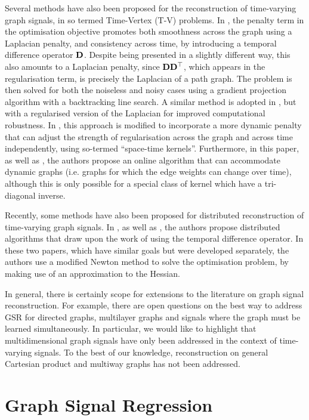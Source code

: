 Several methods have also been proposed for the reconstruction of time-varying graph signals, in so termed Time-Vertex (T-V) problems. In \cite{Qiu2017}, the penalty term in the optimisation objective promotes both smoothness across the graph using a Laplacian penalty, and consistency across time, by introducing a temporal difference operator $\mathbf{D}$. Despite being presented in a slightly different way, this also amounts to a Laplacian penalty, since $\mathbf{D}\mathbf{D}^\top$, which appears in the regularisation term, is precisely the Laplacian of a path graph. The problem is then solved for both the noiseless and noisy cases using a gradient projection algorithm with a backtracking line search. A similar method is adopted in \cite{Giraldo2022}, but with a regularised version of the Laplacian for improved computational robustness. In \cite{Ioannidis2016}, this approach is modified to incorporate a more dynamic penalty that can adjust the strength of regularisation across the graph and across time independently, using so-termed ``space-time kernels''. Furthermore, in this paper, as well as \cite{Romero2017, Ioannidis2018}, the authors propose an online algorithm that can accommodate dynamic graphs (i.e. graphs for which the edge weights can change over time), although this is only possible for a special class of kernel which have a tri-diagonal inverse. 

Recently, some methods have also been proposed for distributed reconstruction of time-varying graph signals. In \cite{Chi2022}, as well as \citep{Zhou2022b}, the authors propose distributed algorithms that draw upon the work of \cite{Qiu2017} using the temporal difference operator. In these two papers, which have similar goals but were developed separately, the authors use a modified Newton method to solve the optimisation problem, by making use of an approximation to the Hessian. 

In general, there is certainly scope for extensions to the literature on graph signal reconstruction. For example, there are open questions on the best way to address GSR for directed graphs, multilayer graphs and signals where the graph must be learned simultaneously. In particular, we would like to highlight that multidimensional graph signals have only been addressed in the context of time-varying signals. To the best of our knowledge, reconstruction on general Cartesian product and multiway graphs has not been addressed. 



\section{Graph Signal Regression}

